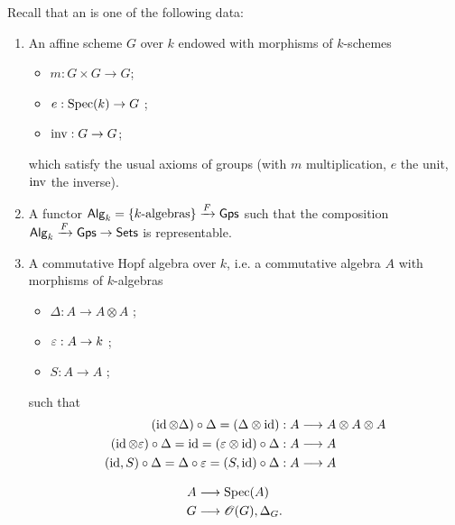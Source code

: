Recall that an  is one of the following data:
\begin{enumerate}[(1)]
	\item An affine scheme $G$ over $k$ endowed with morphisms of $k$-schemes
		\begin{itemize}
			\item $m:G\times G\to G$;
			\item $e:\Spec(k)\to G$ ;
			\item $\i:G\to G$;
		\end{itemize}
		which satisfy the usual axioms of groups (with $m$ multiplication, $e$ the unit, $\operatorname{inv}$
		the inverse).
	\item A functor $\mathsf{Alg}_k = \{k\text{-algebras}\} \xrightarrow{F} \mathsf{Gps}$ such that the
		composition $\Alg_k \xrightarrow{F}\Grp\to \Set$ is representable.
	\item A commutative Hopf algebra over $k$, i.e. a commutative algebra $A$ with morphisms
		of $k$-algebras
		\begin{itemize}
			\item $\Delta:A \to A\otimes A$ ;
			\item $\eps:A\to k$ ;
			\item $S:A\to A$ ;
		\end{itemize}
		such that
		\begin{align*}
			(\id \otimes\Delta) \circ \Delta = (\Delta \otimes \id) &: A \to A\otimes A \otimes A \\
			(\id\otimes \eps) \circ \Delta = \id = (\eps\otimes\id)\circ\Delta &: A \to A \\
			(\id,S)\circ \Delta = \Delta \circ \eps = (S,\id)\circ\Delta &:A \to A
		\end{align*}
\end{enumerate}
\begin{notation}
	\begin{align*}
		A &\to \Spec(A) \\
		G &\to \OO(G), \Delta_G.
	\end{align*}
\end{notation}
